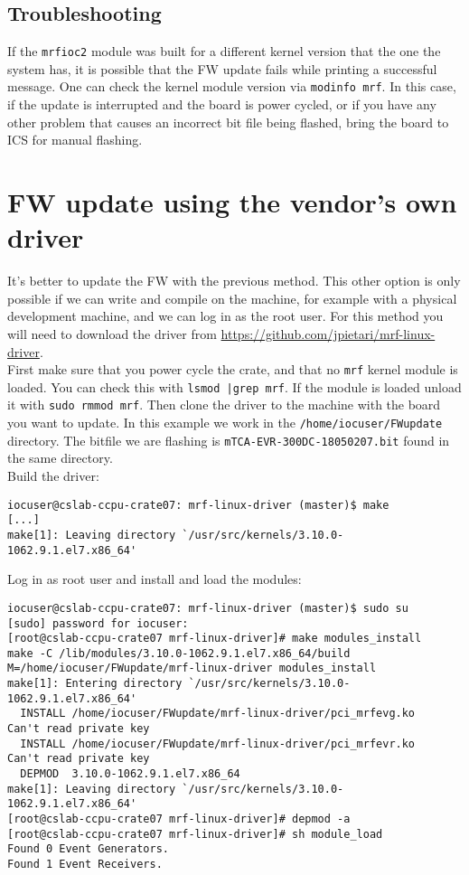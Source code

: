 \documentclass[11pt
  , a4paper
  , article
  , oneside
  , showtrims
]{memoir}
\begin{document}
\subsection{Troubleshooting}
If the \texttt{mrfioc2} module was built for a different kernel version that the one the system has, it is possible that the FW update fails while printing a successful message. One can check the kernel module version via \texttt{modinfo mrf}. In this case, if the update is interrupted and the board is power cycled, or if you have any other problem that causes an incorrect bit file being flashed, bring the board to ICS for manual flashing.\\


\section{FW update using the vendor's own driver}
It's better to update the FW with the previous method. This other option is only possible if we can write and compile on the machine, for example with a physical development machine, and we can log in as the root user. For this method you will need to download the driver from \url{https://github.com/jpietari/mrf-linux-driver}.\\

First make sure that you power cycle the crate, and that no \texttt{mrf} kernel module is loaded. You can check this with \texttt{lsmod |grep mrf}. If the module is loaded unload it with \texttt{sudo rmmod mrf}. Then clone the driver to the machine with the board you want to update. In this example we work in the \texttt{/home/iocuser/FWupdate} directory. The bitfile we are flashing is \texttt{mTCA-EVR-300DC-18050207.bit} found in the same directory.\\

Build the driver:
\begin{lstlisting}[style=termstyle]
iocuser@cslab-ccpu-crate07: mrf-linux-driver (master)$ make
[...]
make[1]: Leaving directory `/usr/src/kernels/3.10.0-1062.9.1.el7.x86_64'
\end{lstlisting}

Log in as root user and install and load the modules:
\begin{lstlisting}[style=termstyle]
iocuser@cslab-ccpu-crate07: mrf-linux-driver (master)$ sudo su
[sudo] password for iocuser:
[root@cslab-ccpu-crate07 mrf-linux-driver]# make modules_install
make -C /lib/modules/3.10.0-1062.9.1.el7.x86_64/build M=/home/iocuser/FWupdate/mrf-linux-driver modules_install
make[1]: Entering directory `/usr/src/kernels/3.10.0-1062.9.1.el7.x86_64'
  INSTALL /home/iocuser/FWupdate/mrf-linux-driver/pci_mrfevg.ko
Can't read private key
  INSTALL /home/iocuser/FWupdate/mrf-linux-driver/pci_mrfevr.ko
Can't read private key
  DEPMOD  3.10.0-1062.9.1.el7.x86_64
make[1]: Leaving directory `/usr/src/kernels/3.10.0-1062.9.1.el7.x86_64'
[root@cslab-ccpu-crate07 mrf-linux-driver]# depmod -a
[root@cslab-ccpu-crate07 mrf-linux-driver]# sh module_load
Found 0 Event Generators.
Found 1 Event Receivers.
\end{lstlisting}
\end{document}
